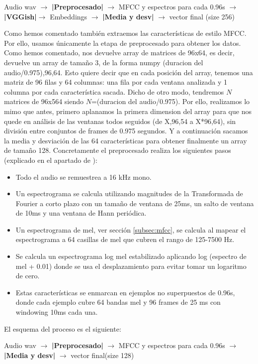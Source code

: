 Audio wav $\rightarrow$ \textbf{|Preprocesado|} $\rightarrow$ MFCC y espectros para cada 0.96s $\rightarrow$ \textbf{|VGGish|}$\rightarrow$ Embeddings $\rightarrow$ \textbf{|Media y desv|} $\rightarrow$ vector final (size 256)

Como hemos comentado también extraemos las características de estilo MFCC. Por ello, usamos únicamente la etapa de preprocesado para obtener los datos. Como hemos comentado, nos devuelve array de matrices de 96x64, es decir, devuelve un array  de tamaño 3, de la forma numpy (duracion del audio/0.975),96,64. Esto quiere decir que en cada posición del array, tenemos una matriz de 96 filas y 64 columnas: una fila por cada ventana analizada y 1 columna por cada característica sacada. Dicho de otro modo, tendremos $N$ matrices de 96x564 siendo $N$=(duracion del audio/0.975). Por ello, realizamos lo mimo que antes, primero aplanamos la primera dimension del array para que nos quede en análisis de las ventanas todos seguidos (de X,96,54 a X*96,64), sin división entre conjuntos de frames de 0.975 segundos. Y a continuación sacamos la media y desviación de las 64 características para obtener finalmente un array de tamaño 128. Concretamente el preprocesado realiza los siguientes pasos (explicado en el apartado  de ):
\begin{itemize}
\item Todo el audio se remuestrea a 16 kHz mono.
\item Un espectrograma se calcula utilizando magnitudes de la Transformada de Fourier a corto plazo con un tamaño de ventana de 25ms, un salto de ventana de 10ms y una ventana de Hann periódica.
\item Un espectrograma de mel, ver sección \ref{subsec:mfcc}, se calcula al mapear el espectrograma a 64 casillas de mel que cubren el rango de 125-7500 Hz.
\item Se calcula un espectrograma log mel estabilizado aplicando log (espectro de mel + 0.01) donde se usa el desplazamiento para evitar tomar un logaritmo de cero.
\item Estas características se enmarcan en ejemplos no superpuestos de 0.96s, donde cada ejemplo cubre 64 bandas mel y 96 frames de 25 ms  con windowing 10ms cada una.
\end{itemize}
El esquema del proceso es el siguiente:

Audio wav $\rightarrow$ \textbf{|Preprocesado|} $\rightarrow$ MFCC y espectros para cada 0.96s $\rightarrow$ \textbf{|Media y desv|} $\rightarrow$ vector final(size 128)


